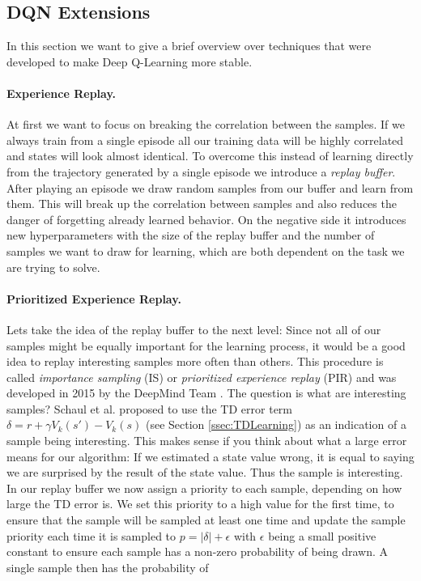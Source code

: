 \subsection{DQN Extensions} \label{ssec:DQNExtensions}
In this section we want to give a brief overview over techniques that were developed to make Deep Q-Learning more stable. 

\paragraph{Experience Replay.}
At first we want to focus on breaking the correlation between the samples. If we always train from a single episode all our training data will be highly correlated and states will look almost identical. To overcome this instead of learning directly from the trajectory generated by a single episode we introduce a \textit{replay buffer}. After playing an episode we draw random samples from our buffer and learn from them. This will break up the correlation between samples and also reduces the danger of forgetting already learned behavior. On the negative side it introduces new hyperparameters with the size of the replay buffer and the number of samples we want to draw for learning, which are both dependent on the task we are trying to solve. 

\paragraph{Prioritized Experience Replay.}
Lets take the idea of the replay buffer to the next level: Since not all of our samples might be equally important for the learning process, it would be a good idea to replay interesting samples more often than others. This procedure is called \textit{importance sampling} (IS) or \textit{prioritized experience replay} (PIR) and was developed in 2015 by the DeepMind Team \cite{schaul2015prioritized}. The question is what are interesting samples? Schaul et al. proposed to use the TD error term $\delta = r+\gamma V_k(s') - V_k(s)$ (see Section \ref{ssec:TDLearning}) as an indication of a sample being interesting. This makes sense if you think about what a large error means for our algorithm: If we estimated a state value wrong, it is equal to saying we are surprised by the result of the state value. Thus the sample is interesting. \\
In our replay buffer we now assign a priority to each sample, depending on how large the TD error is. We set this priority to a high value for the first time, to ensure that the sample will be sampled at least one time and update the sample priority each time it is sampled to $p = |\delta| + \epsilon$ with $\epsilon$ being a small positive constant to ensure each sample has a non-zero probability of being drawn. A single sample then has the probability of 

